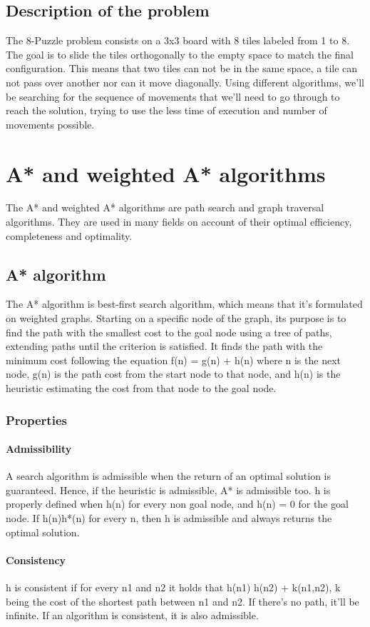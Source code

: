 \documentclass[runningheads]{llncs}
\begin{document}
\subsection{Description of the problem}
The 8-Puzzle problem consists on a 3x3 board with 8 tiles labeled from 1 to 8. The goal is to slide the tiles orthogonally to the empty space to match the final configuration. This means that two tiles can not be in the same space, a tile can not pass over another nor can it move diagonally.
Using different algorithms, we'll be searching for the sequence of movements that we'll need to go through to reach the solution, trying to use the less time of execution and number of movements possible.

\section{A* and weighted A* algorithms} \label{s:awa}
The A* and weighted A* algorithms are path search and graph traversal algorithms. They are used in many fields on account of their optimal efficiency, completeness and optimality.
\subsection{A* algorithm}
The A* algorithm is best-first search algorithm, which means that it's formulated on weighted graphs. Starting on a specific node of the graph, its purpose is to find the path with the smallest cost to the goal node using a tree of paths, extending paths until the criterion is satisfied.
It finds the path with the minimum cost following the equation f(n) = g(n) + h(n) where n is the next node, g(n) is the path cost from the start node to that node, and h(n) is the heuristic estimating the cost from that node to the goal node.
\subsubsection{Properties}
\paragraph{Admissibility}
A search algorithm is admissible when the return of an optimal solution is guaranteed. Hence, if the heuristic is admissible, A* is admissible too. h is properly defined when h(n) for every non goal node, and h(n) = 0 for the goal node. If h(n)\leq h*(n) for every n, then h is admissible and always returns the optimal solution.
\paragraph{Consistency}
h is consistent if for every n1 and n2 it holds that h(n1) \leq h(n2) + k(n1,n2), k being the cost of the shortest path between n1 and n2. If there's no path, it'll be infinite. If an algorithm is consistent, it is also admissible.
\end{document}
